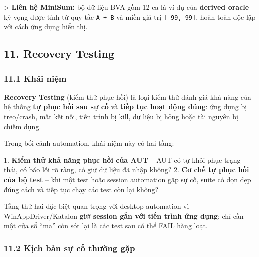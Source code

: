 > \textbf{Liên hệ MiniSum:} bộ dữ liệu BVA gồm 12 ca là ví dụ của \textbf{derived oracle} – kỳ vọng được tính từ quy tắc \texttt{A + B} và miền giá trị \texttt{[-99, 99]}, hoàn toàn độc lập với cách ứng dụng hiển thị.


\subsection{11. Recovery Testing}

\subsubsection{11.1 Khái niệm}

\textbf{Recovery Testing} (kiểm thử phục hồi) là loại kiểm thử đánh giá khả năng của hệ thống \textbf{tự phục hồi sau sự cố} và \textbf{tiếp tục hoạt động đúng}: ứng dụng bị treo/crash, mất kết nối, tiến trình bị kill, dữ liệu bị hỏng hoặc tài nguyên bị chiếm dụng.

Trong bối cảnh automation, khái niệm này có hai tầng:

1. \textbf{Kiểm thử khả năng phục hồi của AUT} – AUT có tự khôi phục trạng thái, có báo lỗi rõ ràng, có giữ dữ liệu đã nhập không?
2. \textbf{Cơ chế tự phục hồi của bộ test} – khi một test hoặc session automation gặp sự cố, suite có dọn dẹp đúng cách và tiếp tục chạy các test còn lại không?

Tầng thứ hai đặc biệt quan trọng với desktop automation vì WinAppDriver/Katalon \textbf{giữ session gắn với tiến trình ứng dụng}: chỉ cần một cửa sổ “ma” còn sót lại là các test sau có thể FAIL hàng loạt.

\subsubsection{11.2 Kịch bản sự cố thường gặp}

